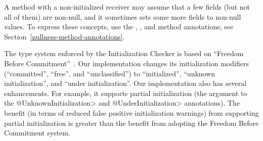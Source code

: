 


A method with a non-initialized receiver may assume that a few fields (but not all
of them) are non-null, and it sometimes sets some more fields to non-null
values.  To express these concepts, use the
,
, and
 method annotations;
see Section~\ref{nullness-method-annotations}.



The type system enforced by the Initialization Checker is based on
``Freedom Before Commitment''~\cite{SummersM2011}.  Our implementation
changes its initialization modifiers (``committed'', ``free'', and
``unclassified'') to ``initialized'', ``unknown initialization'', and
``under initialization''.  Our implementation also has several
enhancements.  For example, it supports partial initialization (the
argument to the \<@UnknownInitialization> and \<@UnderInitialization>
annotations).  The benefit (in terms of reduced false positive
initialization warnings) from supporting partial initialization is
greater than the benefit from adopting the Freedom Before Commitment system.



